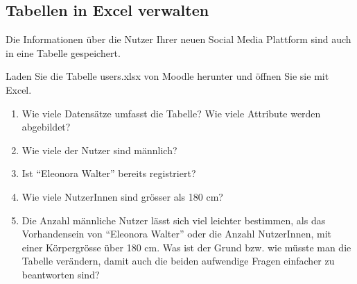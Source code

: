 \subsection{Tabellen in Excel verwalten}
\label{subsec:TabelleInExcel}

Die Informationen über die Nutzer Ihrer neuen Social Media Plattform sind auch in eine Tabelle gespeichert.

\begin{myexercise}
    \label{myexercise:users_in_excel}
      Laden Sie die Tabelle users.xlsx von Moodle herunter und öffnen Sie sie mit Excel.
    \begin{enumerate}
        \item Wie viele Datensätze umfasst die Tabelle? Wie viele Attribute werden abgebildet?
        \item Wie viele der Nutzer sind männlich?
        \item Ist \enquote{Eleonora Walter} bereits registriert?
        \item Wie viele NutzerInnen sind grösser als 180 cm?
        \item Die Anzahl männliche Nutzer lässt sich viel leichter bestimmen, als das Vorhandensein von \enquote{Eleonora Walter} oder die Anzahl NutzerInnen, mit einer Körpergrösse über 180 cm. Was ist der Grund bzw. wie müsste man die Tabelle verändern, damit auch die beiden aufwendige Fragen einfacher zu beantworten sind?
    \end{enumerate}
\end{myexercise}



